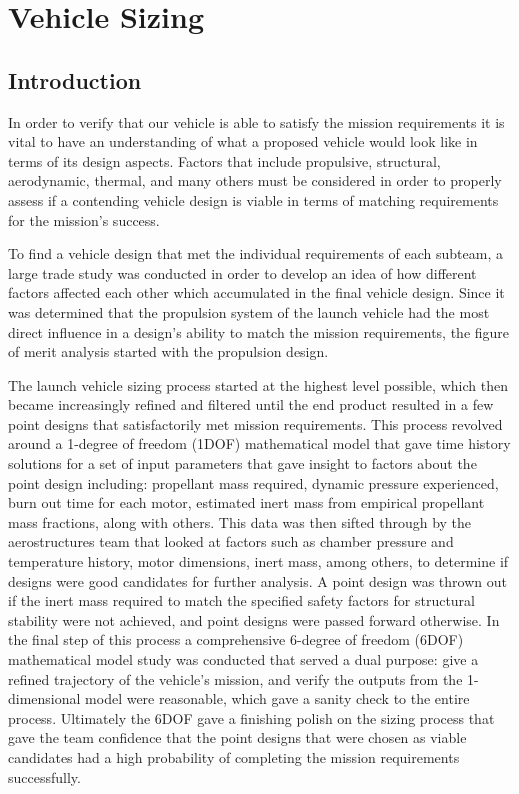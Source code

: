 \section{Vehicle Sizing} \label{section:sizing}
\subsection{Introduction}
In order to verify that our vehicle is able to satisfy the mission requirements it is vital to have an understanding of what a proposed vehicle would look like in terms of its design aspects. Factors that include propulsive, structural, aerodynamic, thermal, and many others must be considered in order to properly assess if a contending vehicle design is viable in terms of matching requirements for the mission's success.

To find a vehicle design that met the individual requirements of each subteam, a large trade study was conducted in order to develop an idea of how different factors affected each other which accumulated in the final vehicle design. Since it was determined that the propulsion system of the launch vehicle had the most direct influence in a design's ability to match the mission requirements, the figure of merit analysis started with the propulsion design.

The launch vehicle sizing process started at the highest level possible, which then became increasingly refined and filtered until the end product resulted in a few point designs that satisfactorily met mission requirements. This process revolved around a 1-degree of freedom (1DOF) mathematical model that gave time history solutions for a set of input parameters that gave insight to factors about the point design including: propellant mass required, dynamic pressure experienced, burn out time for each motor, estimated inert mass from empirical propellant mass fractions, along with others. This data was then sifted through by the aerostructures team that looked at factors such as chamber pressure and temperature history, motor dimensions, inert mass, among others, to determine if designs were good candidates for further analysis. A point design was thrown out if the inert mass required to match the specified safety factors for structural stability were not achieved, and point designs were passed forward otherwise. In the final step of this process a comprehensive 6-degree of freedom (6DOF) mathematical model study was conducted that served a dual purpose: give a refined trajectory of the vehicle’s mission, and verify the outputs from the 1-dimensional model were reasonable, which gave a sanity check to the entire process. Ultimately the 6DOF gave a finishing polish on the sizing process that gave the team confidence that the point designs that were chosen as viable candidates had a high probability of completing the mission requirements successfully.

